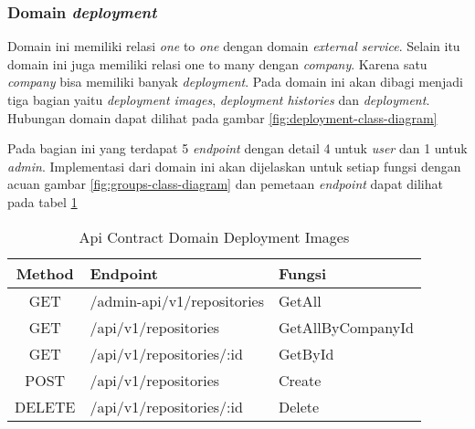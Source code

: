 \subsubsection{Domain \textit{deployment}}

Domain ini memiliki relasi \textit{one} to \textit{one} dengan domain \textit{external service}. Selain itu domain ini juga memiliki relasi one to many dengan \textit{company}. Karena satu \textit{company} bisa memiliki banyak \textit{deployment}. Pada domain ini akan dibagi menjadi tiga bagian yaitu \textit{deployment images}, \textit{deployment histories} dan \textit{deployment}. Hubungan domain dapat dilihat pada gambar \ref*{fig:deployment-class-diagram}

Pada bagian ini yang terdapat 5 \textit{endpoint} dengan detail 4 untuk \textit{user} dan 1 untuk \textit{admin}. Implementasi dari domain ini akan dijelaskan untuk setiap fungsi dengan acuan gambar \ref{fig:groups-class-diagram} dan pemetaan \textit{endpoint} dapat dilihat pada tabel \ref{tab:api-contract-domain-deployment-images}

\bgroup
\begin{table}[ht]
  \caption{Api Contract Domain Deployment Images}
  \label{tab:api-contract-domain-deployment-images}
  \def\arraystretch{1.7}
  \centering
  \begin{tabular}{|c|p{6cm}|p{4cm}|}
    \hline
    Method & Endpoint                   &
    Fungsi                                                  \\
    \hline
    GET    & /admin-api/v1/repositories & GetAll            \\
    \hline
    GET    & /api/v1/repositories       & GetAllByCompanyId \\
    \hline
    GET    & /api/v1/repositories/:id   & GetById           \\
    \hline
    POST   & /api/v1/repositories       & Create            \\
    \hline
    DELETE & /api/v1/repositories/:id   & Delete            \\
    \hline
  \end{tabular}
\end{table}
\egroup


